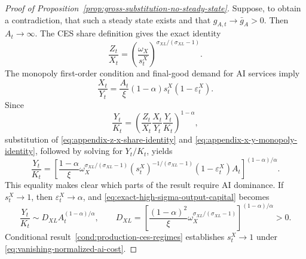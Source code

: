 \begin{proof}[Proof of Proposition~\ref{prop:gross-substitution-no-steady-state}]
Suppose, to obtain a contradiction, that such a steady state exists and that
$g_{A,t}\to\bar g_A>0$. Then $A_t\to\infty$.
The CES share definition gives the exact identity
\begin{equation}
    \frac{Z_t}{X_t}
    =
    \left(\frac{\omega_X}{s^X_t}\right)^{
        \sigma_{XL}/(\sigma_{XL}-1)}.
    \label{eq:appendix-z-x-share-identity}
\end{equation}
The monopoly first-order condition and final-good demand for AI services imply
\begin{equation}
    \frac{X_t}{Y_t}
    =
    \frac{A_t}{\xi}(1-\alpha)s^X_t
    (1-\varepsilon^X_t).
    \label{eq:appendix-x-y-monopoly-identity}
\end{equation}
Since
\[
    \frac{Y_t}{K_t}
    =
    \left(
        \frac{Z_t}{X_t}
        \frac{X_t}{Y_t}
        \frac{Y_t}{K_t}
    \right)^{1-\alpha},
\]
substitution of \eqref{eq:appendix-z-x-share-identity} and
\eqref{eq:appendix-x-y-monopoly-identity}, followed by solving for $Y_t/K_t$,
yields
\begin{equation}
    \frac{Y_t}{K_t}
    =
    \left[
        \frac{1-\alpha}{\xi}
        \omega_X^{\sigma_{XL}/(\sigma_{XL}-1)}
        (s^X_t)^{-1/(\sigma_{XL}-1)}
        (1-\varepsilon^X_t)A_t
    \right]^{(1-\alpha)/\alpha}.
    \label{eq:exact-high-sigma-output-capital}
\end{equation}
This equality makes clear which parts of the result require AI dominance. If
$s^X_t\to1$, then $\varepsilon^X_t\to\alpha$, and
\eqref{eq:exact-high-sigma-output-capital} becomes
\begin{equation}
    \frac{Y_t}{K_t}
    \sim
    D_{XL}A_t^{(1-\alpha)/\alpha},
    \qquad
    D_{XL}
    =
    \left[
        \frac{(1-\alpha)^2}{\xi}
        \omega_X^{\sigma_{XL}/(\sigma_{XL}-1)}
    \right]^{(1-\alpha)/\alpha}>0.
    \label{eq:appendix-high-sigma-output-capital-limit}
\end{equation}
Conditional result~\ref{cond:production-ces-regimes} establishes $s^X_t\to1$ under
\eqref{eq:vanishing-normalized-ai-cost}.


\end{proof}
